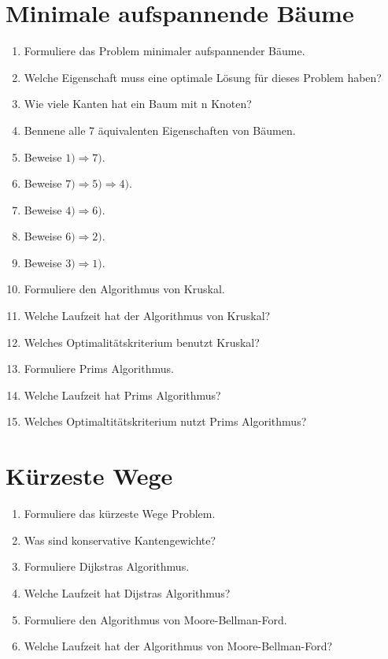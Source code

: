 \documentclass[a4paper,10pt]{scrreprt}
\begin{document}
	\section{Minimale aufspannende Bäume}
	\begin{enumerate}
		\item Formuliere das Problem minimaler aufspannender Bäume.
		\item Welche Eigenschaft muss eine optimale Lösung für dieses Problem haben?
		\item Wie viele Kanten hat ein Baum mit n Knoten?
		\item Bennene alle 7 äquivalenten Eigenschaften von Bäumen.
		\item Beweise $1)\Rightarrow 7)$.
		\item Beweise $7) \Rightarrow 5) \Rightarrow 4)$.
		\item Beweise $4) \Rightarrow 6)$.
		\item Beweise $6) \Rightarrow 2)$.
		\item Beweise $3) \Rightarrow 1)$.
		\item Formuliere den Algorithmus von Kruskal.
		\item Welche Laufzeit hat der Algorithmus von Kruskal?
		\item Welches Optimalitätskriterium benutzt Kruskal?
		\item Formuliere Prims Algorithmus.
		\item Welche Laufzeit hat Prims Algorithmus?
		\item Welches Optimaltitätskriterium nutzt Prims Algorithmus?
	\end{enumerate}
	\section{Kürzeste Wege}
	\begin{enumerate}
		\item Formuliere das kürzeste Wege Problem.
		\item Was sind konservative Kantengewichte?
		\item Formuliere Dijkstras Algorithmus.
		\item Welche Laufzeit hat Dijstras Algorithmus?
		\item Formuliere den Algorithmus von Moore-Bellman-Ford.
		\item Welche Laufzeit hat der Algorithmus von Moore-Bellman-Ford?
	\end{enumerate}
\end{document}
